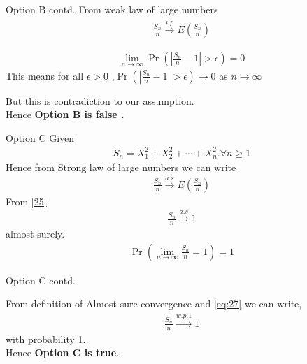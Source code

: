 \documentclass{beamer}
\providecommand{\pr}[1]{\ensuremath{\Pr\left(#1\right)}}
\begin{document}
\begin{frame}{Option B contd.}
From weak law of large numbers
\begin{align}
    \frac{S_n}{n} \xrightarrow{i.p}  E\left(\frac{S_n}{n}\right)
\end{align}

\begin{align}
    \lim_{n \to \infty} \pr{\left|{\frac{S_n}{n}-1}\right|>\epsilon}=0
\end{align}
This means for all $\epsilon>0$ ,$\pr{\left|{\frac{S_n}{n}-1}\right|>\epsilon}\to 0$ as $n \to \infty$

But this is contradiction to our assumption.\\
Hence \textbf{Option B is false .}


    
\end{frame}
\begin{frame}{Option C}
   Given 
\begin{align}
    S_{n}=X_{1}^2+X_{2}^2+\cdots+X_{n}^2.\forall n\geq 1
\end{align}
Hence from Strong law of large numbers we can write 
\begin{align}
    \frac{S_n}{n} \xrightarrow{a.s} E\left(\frac{S_n}{n}\right)
\end{align}
From \eqref{25}
\begin{align}
     \frac{S_n}{n} \xrightarrow{a.s} 1
\end{align}
almost surely.
\begin{align}
    \pr{\lim_{n\to \infty}\frac{S_n}{n}=1}=1\label{eq:27}
\end{align}
\end{frame}

\begin{frame}{Option C contd.}

From definition of Almost sure convergence and \eqref{eq:27} we can write,
\begin{align}
    \frac{S_{n}}{n} \xrightarrow{w.p.1} 1
\end{align}
with probability 1.\\
Hence \textbf{Option C is true}.


\end{frame}
\end{document}
